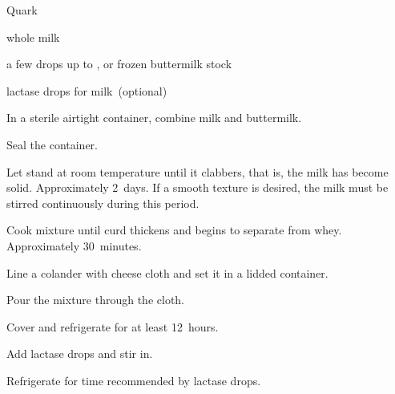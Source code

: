\begin{recipe}{Quark}{}{}

\begin{ingredients}
\item {} whole milk
\item a few drops up to \C{\half} , or frozen buttermilk stock
\item lactase drops for  milk~(optional)
\end{ingredients}

\begin{directions}
\item In a sterile airtight container, combine milk and buttermilk.
\item Seal the container.
\item Let stand at room temperature until it clabbers, that is, the milk has become solid. Approximately 2~days. If a smooth texture is desired, the milk must be stirred continuously during this period.
\item Cook mixture until curd thickens and begins to separate from whey. Approximately 30~minutes.
\item Line a colander with cheese cloth and set it in a lidded container.
\item Pour the mixture through the cloth.
\item Cover and refrigerate for at least 12~hours.
\item Add lactase drops and stir in.
\item Refrigerate for time recommended by lactase drops.
\end{directions}
\end{recipe}
